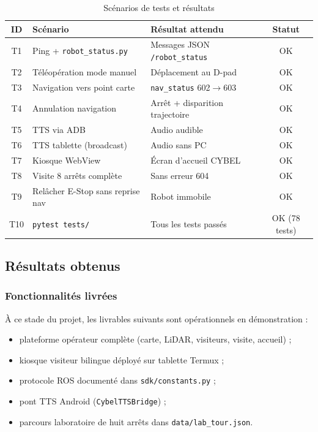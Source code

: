 \begin{table}[H]
\centering
\caption{Scénarios de tests et résultats}
\label{tab:scenarios_tests}
\small
\begin{tabular}{|c|p{4cm}|p{3.5cm}|c|}
\hline
\textbf{ID} & \textbf{Scénario} & \textbf{Résultat attendu} & \textbf{Statut} \\
\hline
T1 & Ping + \texttt{robot\_status.py} & Messages JSON \texttt{/robot\_status} & OK \\
\hline
T2 & Téléopération mode manuel & Déplacement au D-pad & OK \\
\hline
T3 & Navigation vers point carte & \texttt{nav\_status} 602$\rightarrow$603 & OK \\
\hline
T4 & Annulation navigation & Arrêt + disparition trajectoire & OK \\
\hline
T5 & TTS via ADB & Audio audible & OK \\
\hline
T6 & TTS tablette (broadcast) & Audio sans PC & OK \\
\hline
T7 & Kiosque WebView & Écran d'accueil CYBEL & OK \\
\hline
T8 & Visite 8 arrêts complète & Sans erreur 604 & OK \\
\hline
T9 & Relâcher E-Stop sans reprise nav & Robot immobile & OK \\
\hline
T10 & \texttt{pytest tests/} & Tous les tests passés & OK (78 tests) \\
\hline
\end{tabular}
\end{table}

\newpage
\subsection{Résultats obtenus}

\subsubsection{Fonctionnalités livrées}

À ce stade du projet, les livrables suivants sont opérationnels en
démonstration :
\begin{itemize}
    \item plateforme opérateur complète (carte, LiDAR, visiteurs, visite, accueil) ;
    \item kiosque visiteur bilingue déployé sur tablette Termux ;
    \item protocole ROS documenté dans \texttt{sdk/constants.py} ;
    \item pont TTS Android (\texttt{CybelTTSBridge}) ;
    \item parcours laboratoire de huit arrêts dans \texttt{data/lab\_tour.json}.
\end{itemize}

